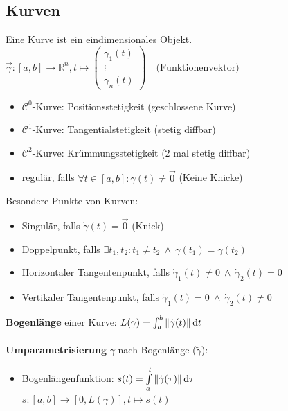 \documentclass[6pt,a4paper]{scrartcl}
\newcommand{\norm}[2][\relax]{\ifx#1\relax \ensuremath{\left\Vert#2\right\Vert}\else \ensuremath{\left\Vert#2\right\Vert_{#1}}\fi}
\newcommand{\ra}[0]{\ensuremath{\rightarrow}}
\begin{document}
\begin{multicols*}{4}
\subsection{Kurven}
Eine Kurve ist ein eindimensionales Objekt.\\
$ \vec \gamma:[a,b] \rightarrow \mathbb R^n, t \mapsto \begin{pmatrix} \gamma_1(t) \\ \vdots \\ \gamma_n(t) \end{pmatrix} \quad \text{(Funktionenvektor)} $
\begin{itemize}\itemsep-2pt
	\item $\mathcal C^0$-Kurve: Positionsstetigkeit (geschlossene Kurve)
	\item $\mathcal C^1$-Kurve: Tangentialstetigkeit (stetig diffbar)
	\item $\mathcal C^2$-Kurve: Krümmungsstetigkeit (2 mal stetig diffbar)
	\item regulär, falls $\forall t \in [a,b]:\dot \gamma(t) \ne \vec 0$ (Keine Knicke)
\end{itemize}
Besondere Punkte von Kurven:
\begin{itemize}\itemsep-2pt
	\item Singulär, falls $\dot \gamma(t)=\vec 0$ (Knick)
	\item Doppelpunkt, falls $\exists t_1,t_2:t_1 \ne t_2 \ \land \ \gamma(t_1)=\gamma(t_2)$
	\item Horizontaler Tangentenpunkt, falls $\dot \gamma_1(t) \ne 0 \ \land \ \dot \gamma_2(t)=0$
	\item Vertikaler Tangentenpunkt, falls $\dot \gamma_1(t) = 0 \ \land \ \dot \gamma_2(t) \ne 0$
\end{itemize}
\textbf{Bogenlänge} einer Kurve: $L(\gamma) = \int_{a}^{b} \norm{\dot \gamma(t)} \mathrm dt$ \\ \\
\textbf{Umparametrisierung} $\gamma$ nach Bogenlänge ($\tilde \gamma$):
\begin{itemize} \itemsep0pt
	\item Bogenlängenfunktion: $s(t) = \int\limits_a^t \norm{\dot \gamma(\tau)} \mathrm d\tau$\\
		$s: [a,b] \ra [0,L(\gamma)], t \mapsto s(t)$

\end{itemize}
\end{multicols*}
\end{document}
